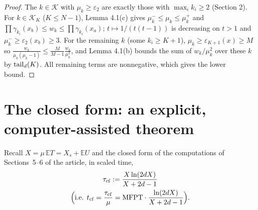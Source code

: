 \documentclass[11pt,a4paper]{article}
\theoremstyle{definition}
\theoremstyle{remark}
\begin{document}
\begin{proof}
The $k\in\mathcal K$ with $\mu_k\ge\varepsilon_2$ are exactly those with $\max_ik_i\ge2$ (Section 2). For $k\in\mathcal K_K$ ($K\le N-1$), Lemma 4.1(c) gives $\mu_k^-\le\mu_k\le\mu_k^+$ and $\prod\gamma_{k_i}(x_b)\le w_k\le\prod\gamma_{k_i}(x_a)$; $t\mapsto1/(t(t-1))$ is decreasing on $t>1$ and $\mu_k^-\ge\varepsilon_2(x_b)\ge3$. For the remaining $k$ (some $k_i\ge K+1$), $\mu_k\ge\varepsilon_{K+1}(x)\ge M$ so $\frac{w_k}{\mu_k(\mu_k-1)}\le\frac{M}{M-1}\frac{w_k}{\mu_k^2}$, and Lemma 4.1(b) bounds the sum of $w_k/\mu_k^2$ over these $k$ by ${\rm tail}_d(K)$. All remaining terms are nonnegative, which gives the lower bound.
\end{proof}

\setcounter{section}{4}
\section{The closed form: an explicit, computer-assisted theorem}

Recall $X=\mu\,\mathbb E T=X_s+\mathbb EU$ and the closed form of the computations of Sections~5--6 of the article, in scaled time,
\begin{gather*}
\tau_{\rm cf}:=\frac{X\ln(2dX)}{X+2d-1} \\
\Bigl(\text{i.e. } t_{\rm cf}=\frac{\tau_{\rm cf}}{\mu}={\rm MFPT}\cdot\frac{\ln(2dX)}{X+2d-1}\Bigr).
\end{gather*}
\end{document}

